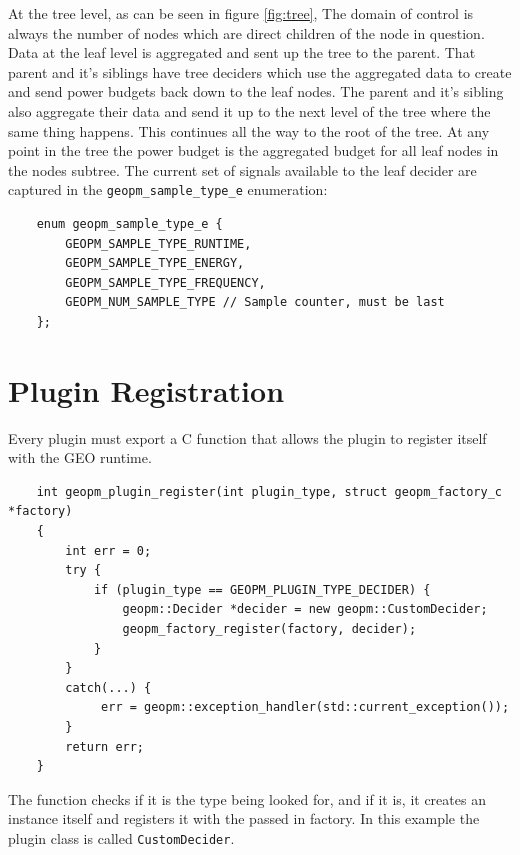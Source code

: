 \documentclass[11pt]{article}
\begin{document}
At the tree level, as can be seen in figure \ref{fig:tree}, The domain
of control is always the number of nodes which are direct children of
the node in question. Data at the leaf level is aggregated and sent up
the tree to the parent. That parent and it’s siblings have tree
deciders which use the aggregated data to create and send power
budgets back down to the leaf nodes. The parent and it’s sibling also
aggregate their data and send it up to the next level of the tree
where the same thing happens. This continues all the way to the root
of the tree. At any point in the tree the power budget is the
aggregated budget for all leaf nodes in the nodes subtree. The current
set of signals available to the leaf decider are captured in the
\verb#geopm_sample_type_e# enumeration:

\begin{verbatim}
    enum geopm_sample_type_e {
        GEOPM_SAMPLE_TYPE_RUNTIME,
        GEOPM_SAMPLE_TYPE_ENERGY,
        GEOPM_SAMPLE_TYPE_FREQUENCY,
        GEOPM_NUM_SAMPLE_TYPE // Sample counter, must be last
    };
\end{verbatim}

\section{Plugin Registration}
Every plugin must export a C function that allows the plugin to
register itself with the GEO runtime.

\begin{verbatim}
    int geopm_plugin_register(int plugin_type, struct geopm_factory_c *factory)
    {
        int err = 0;
        try {
            if (plugin_type == GEOPM_PLUGIN_TYPE_DECIDER) {
                geopm::Decider *decider = new geopm::CustomDecider;
                geopm_factory_register(factory, decider);
            }
        }
        catch(...) {
             err = geopm::exception_handler(std::current_exception());
        }
        return err;
    }
\end{verbatim}
The function checks if it is the type being looked for, and if it is,
it creates an instance itself and registers it with the passed in
factory. In this example the plugin class is called
\verb#CustomDecider#.
\end{document}
